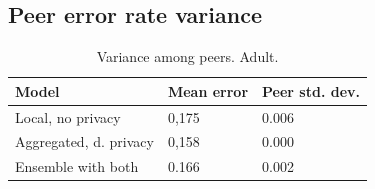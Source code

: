 \subsection{Peer error rate variance}
\label{sec:results_peer_error_variance}
\begin{table}[H]
	\centering

	\begin{tabular}{|l|l|l|}
		\textbf{Model}                  & \textbf{Mean error} & \textbf{Peer std. dev.} \\
		\hline
		Local, no privacy      & 0,175 & 0.006 \\
		Aggregated, d. privacy & 0,158 & 0.000	 \\
		Ensemble with both & 0.166 & 0.002 \\
	\end{tabular}
	\caption{Variance among peers. Adult.}
	\label{table:peer_variance_adult}
\end{table}      

